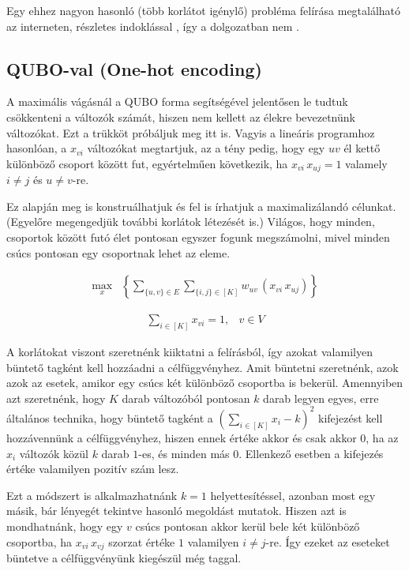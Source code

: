 Egy ehhez nagyon hasonló (több korlátot igénylő) probléma felírása megtalálható az interneten, részletes indoklással \cite{Hojny2021}, így a dolgozatban nem . 

\subsection{QUBO-val (One-hot encoding)}\label{sec:QUBOonehot}


A maximális vágásnál a QUBO forma segítségével jelentősen le tudtuk csökkenteni a változók számát, hiszen nem kellett az élekre bevezetnünk változókat. Ezt a trükköt próbáljuk meg itt is.
Vagyis a lineáris programhoz hasonlóan, a $x_{vi}$ változókat megtartjuk, az a tény pedig, hogy egy $uv$ él kettő különböző csoport között fut, egyértelműen következik, ha $x_{vi} \, x_{uj}=1$ valamely $i \neq j$ és $u \neq v$-re.

Ez alapján meg is konstruálhatjuk és fel is írhatjuk a maximalizálandó célunkat. (Egyelőre megengedjük további korlátok létezését is.) Világos, hogy minden, csoportok között futó élet pontosan egyszer fogunk megszámolni, mivel minden csúcs pontosan egy csoportnak lehet az eleme.

\begin{align}
	 \max_{x} & \left\{ \sum _{\{{u,v}\} \in E}  \sum _{\{{i,j}\} \in [K]} w_{uv}\,(x_{vi} \, x_{uj}) \right\}
\end{align}

\begin{align}
	\sum _{i \in [K]} x_{vi} = 1, &v \in V
\end {align}

A korlátokat viszont szeretnénk kiiktatni a felírásból, így azokat valamilyen büntető tagként kell hozzáadni a célfüggvényhez. Amit büntetni szeretnénk, azok azok az esetek, amikor egy csúcs két különböző csoportba is bekerül. Amennyiben azt szeretnénk, hogy $K$ darab változóból pontosan $k$ darab legyen egyes, erre általános technika, hogy büntető tagként a $(\sum _{i \in [K]} x_i - k)^2 $ kifejezést kell hozzávennünk a célfüggvényhez, hiszen ennek értéke akkor és csak akkor $0$, ha az $x_i$ változók közül $k$ darab $1$-es, és minden más $0$. Ellenkező esetben a kifejezés értéke valamilyen pozitív szám lesz.

Ezt a módszert is alkalmazhatnánk $k=1$ helyettesítéssel, azonban most egy másik, bár lényegét tekintve hasonló megoldást mutatok. Hiszen azt is mondhatnánk, hogy egy $v$ csúcs pontosan akkor kerül bele két különböző csoportba, ha $x_{vi} \, x_{vj}$ szorzat értéke $1$ valamilyen $i \neq j$-re. Így ezeket az eseteket büntetve a célfüggvényünk kiegészül még  taggal. 

